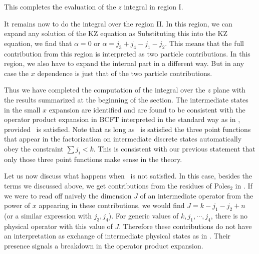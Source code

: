 This completes the evaluation of the $z$ integral in region I.


It remains now to do the integral over the region II. In this region, we
can expand any solution of the KZ equation as
\eqn{}
Substituting this into the KZ equation, we find that
$\alpha = 0$ or $\alpha = j_3+j_4 - j_1-j_2$. This means that
the full contribution from this region is  interpreted as two
particle contributions. In this region, we also have to expand the
internal part in a different way. But in any case the $x$ dependence
is just that of the two particle contributions.

Thus we have completed the computation of the integral over the $z$ plane
with the results summarized at the beginning of the section.
The intermediate states in the small $x$ expansion are identified
and are found to be consistent with the operator product expansion
in BCFT interpreted in the standard way as in \expan ,
provided \physcond\ is satisfied. Note that as long as \physcond\ is
satisfied  the three point functions that appear in the factorization
on intermediate discrete states automatically obey the
constraint $ \sum j_i < k$. This is consistent with our previous
statement that only those three point functions make sense in
the theory.



Let us now discuss what happens when \physcond\ is not satisfied.
In this case, besides the terms we discussed above, we get
contributions from the residues of Poles$_2$ in \poles .
If we were to read off naively
the dimension $J$ of an intermediate operator from the power of $x$
appearing in these contributions,
we would find $J = k-j_1-j_2 + n $ (or a similar expression with
$j_3,j_4$). For generic values of $k, j_1, \cdots, j_4$, there is no
physical
operator with this value of $J$.  Therefore  these contributions do
not have an interpretation as exchange of intermediate physical
states as in \expan .
Their presence signals a breakdown in the operator product expansion.

